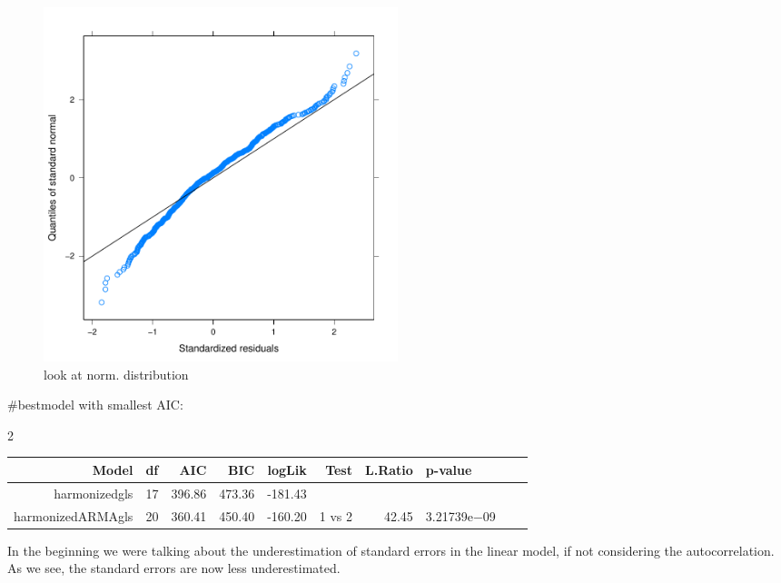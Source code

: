 \documentclass[11pt, a4paper]{article} %
\begin{document}
\begin{figure}[H]
\begin{center}
\includegraphics[width=0.5\textwidth]{alleselena-finalgls_norm.pdf}
\caption{look at norm. distribution}
\label{finalgls_norm}
\end{center}
\end{figure}

\linebreak
#bestmodel with smallest AIC: \\
\begin{Schunk}
\begin{Soutput}
[1] 2
\end{Soutput}
\end{Schunk}

\begin{table}[ht]
\centering
\begin{tabular}{rlrrrrrlrr}
  \hline
 Model & df & AIC & BIC & logLik & Test & L.Ratio & p-value \\ 
  \hline
harmonizedgls  &    17 & 396.86 & 473.36 & -181.43 &  &  &  \\ 
  harmonizedARMAgls  &    20 & 360.41 & 450.40 & -160.20 & 1 vs 2 & 42.45 & 3.21739e$-$09 \\ 
   \hline
\end{tabular}
\end{table}

\linebreak

In the beginning we were talking about the underestimation of standard errors in the linear model, if not considering the autocorrelation. As we see, the standard errors are now less underestimated. 
\end{document}
